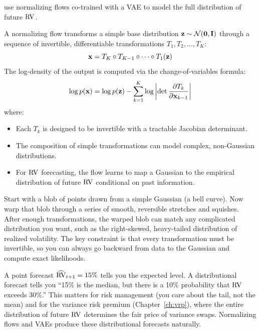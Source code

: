 \citet{DuMoriyamaTanakaIshii2023} use normalizing flows co-trained with a VAE to model the full distribution of future $\operatorname{RV}$.

\begin{definition}
A normalizing flow transforms a simple base distribution $\mathbf{z} \sim \mathcal{N}(\mathbf{0}, \mathbf{I})$ through a sequence of invertible, differentiable transformations $T_1, T_2, \ldots, T_K$:
\begin{equation}\label{eq:nflow}
  \mathbf{x} = T_K \circ T_{K-1} \circ \cdots \circ T_1(\mathbf{z})
\end{equation}
The log-density of the output is computed via the change-of-variables formula:
\begin{equation}\label{eq:nflow-density}
  \log p(\mathbf{x}) = \log p(\mathbf{z}) - \sum_{k=1}^{K} \log \left| \det \frac{\partial T_k}{\partial \mathbf{x}_{k-1}} \right|
\end{equation}
where:
\begin{itemize}[nosep]
  \item Each $T_k$ is designed to be invertible with a tractable Jacobian determinant.
  \item The composition of simple transformations can model complex, non-Gaussian distributions.
  \item For $\operatorname{RV}$ forecasting, the flow learns to map a Gaussian to the empirical distribution of future $\operatorname{RV}$ conditional on past information.
\end{itemize}
\end{definition}

\begin{intuition}
Start with a blob of points drawn from a simple Gaussian (a bell curve).
Now warp that blob through a series of smooth, reversible stretches and squishes.
After enough transformations, the warped blob can match any complicated distribution you want, such as the right-skewed, heavy-tailed distribution of realized volatility.
The key constraint is that every transformation must be invertible, so you can always go backward from data to the Gaussian and compute exact likelihoods.
\end{intuition}

\begin{keyidea}
A point forecast $\widehat{\operatorname{RV}}_{t+1} = 15\%$ tells you the expected level.
A distributional forecast tells you ``15\% is the median, but there is a 10\% probability that $\operatorname{RV}$ exceeds 30\%.''
This matters for risk management (you care about the tail, not the mean) and for the variance risk premium (Chapter~\ref{ch:vrp}), where the entire distribution of future $\operatorname{RV}$ determines the fair price of variance swaps.
Normalizing flows and VAEs produce these distributional forecasts naturally.
\end{keyidea}


